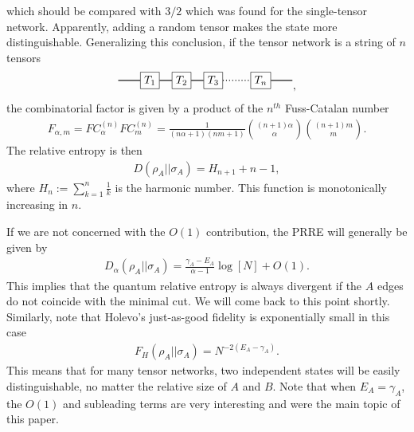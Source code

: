 \documentclass[a4paper,11pt]{article}
\newcommand*{\JKF}[1]{\textcolor{blue}{[JKF: #1]}}
\newcommand*{\SR}[1]{\textcolor{magenta}{[SR: \textsf{#1}]}}
\begin{document}
which should be compared with $3/2$ which was found for the single-tensor network. Apparently, adding a random tensor makes the state more distinguishable. Generalizing this conclusion, if the tensor network is a string of $n$ tensors
\begin{align}
\begin{tikzpicture}
    \node[draw, shape=rectangle] (T1) at (0,0) {$T_1$};
    \node[draw, shape=rectangle] (T2) at (1,0) {$T_2$};
    \node[draw, shape=rectangle] (T3) at (2,0) {$T_3$};
    \node[draw, shape=rectangle] (T4) at (3.5,0) {$T_n$};
    \draw [thick] (T1) -- (T2);
    \draw [thick] (T1) -- (-1,0);
    \draw [thick] (T2) -- (T3);
    \draw [thick,dotted] (T3) -- (T4);
    \draw [thick] (T4) -- (4.5,0);
    \end{tikzpicture},
\end{align}
the combinatorial factor is given by a product of the $n^{th}$ Fuss-Catalan number
\begin{align}
    F_{\alpha,m} = FC^{(n)}_{\alpha}FC^{(n)}_{m} = \frac{1}{(n\alpha + 1)(nm+1)}\binom{(n+1)\alpha }{\alpha}\binom{(n+1)m}{m}.
\end{align}
The relative entropy is then 
\begin{align}
    D(\rho_A||\sigma_A) = H_{n+1}+n-1,
\end{align}
where $H_n:=\sum_{k=1}^n\frac{1}{k}$ is the harmonic number. 
This function is monotonically increasing in $n$.

If we are not concerned with the $O(1)$ contribution, the PRRE will generally be given by
\begin{align}
    D_{\alpha}(\rho_A || \sigma_A) = \frac{\gamma_A -E_A}{\alpha-1}\log \left[N\right] +O(1).
\end{align}
This implies that the quantum relative entropy is always divergent if the $A$ edges do not coincide with the minimal cut. We will come back to this point shortly. Similarly, note that Holevo's just-as-good fidelity is exponentially small in this case
\begin{align}
    F_H(\rho_A ||\sigma_A) = N^{-2(E_A-\gamma_A)}.
\end{align}
This means that for many tensor networks, two independent states will be easily distinguishable, no matter the relative size of $A$ and $B$. Note that when $E_A=\gamma_A$, the $O(1)$ and subleading terms are very interesting and were the main topic of this paper.
\end{document}
